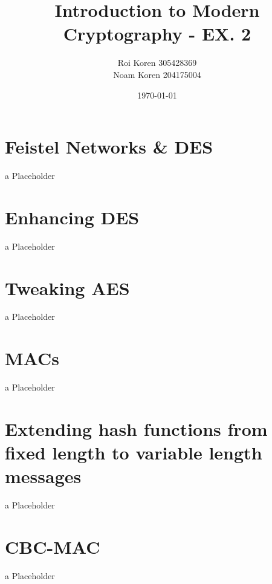 \documentclass{article}
\begin{document}
\title{Introduction to Modern Cryptography - EX. 2}
\author{Roi Koren 305428369\\ Noam Koren 204175004}
\date{\today}
\maketitle
\newpage
{}

\section{Feistel Networks \& DES}
\begin{paragraph}
	a Placeholder
\end{paragraph}

\section{Enhancing DES}
\begin{paragraph}
	a Placeholder
\end{paragraph}

\section{Tweaking AES}
\begin{paragraph}
	a Placeholder
\end{paragraph}

\section{MACs}
\begin{paragraph}
	a Placeholder
\end{paragraph}

\section{Extending hash functions from fixed length to variable length messages}
\begin{paragraph}
	a Placeholder
\end{paragraph}

\section{CBC-MAC}
\begin{paragraph}
	a Placeholder
\end{paragraph}
\end{document}
